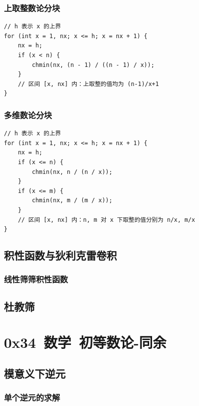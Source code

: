 \documentclass{article}
\begin{document}
\subsubsection{上取整数论分块}

\begin{verbatim}
// h 表示 x 的上界
for (int x = 1, nx; x <= h; x = nx + 1) {
    nx = h;
    if (x < n) {
        chmin(nx, (n - 1) / ((n - 1) / x));
    }
    // 区间 [x, nx] 内：上取整的值均为 (n-1)/x+1
}
\end{verbatim}

\subsubsection{多维数论分块}

\begin{verbatim}
// h 表示 x 的上界
for (int x = 1, nx; x <= h; x = nx + 1) {
    nx = h;
    if (x <= n) {
        chmin(nx, n / (n / x));
    }
    if (x <= m) {
        chmin(nx, m / (m / x));
    }
    // 区间 [x, nx] 内：n, m 对 x 下取整的值分别为 n/x, m/x
}
\end{verbatim}

\subsection{积性函数与狄利克雷卷积}

\subsubsection{线性筛筛积性函数}


\subsection{杜教筛}


\section{0x34\ 数学\ 初等数论-同余}

\subsection{模意义下逆元}

\subsubsection{单个逆元的求解}
\end{document}
